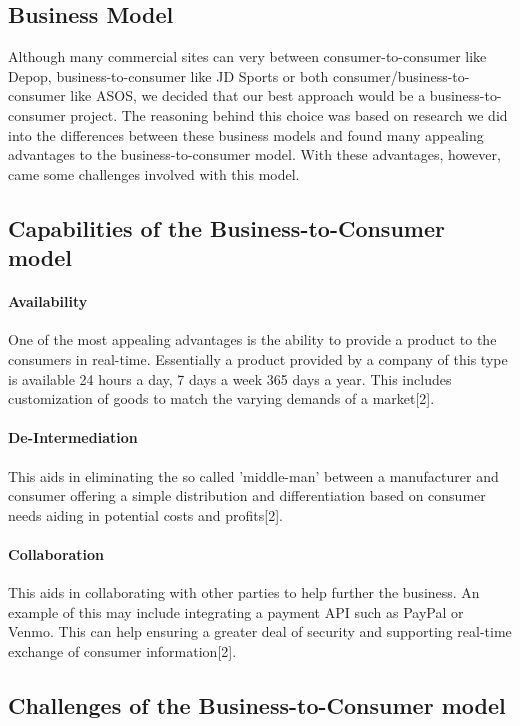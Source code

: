 \subsection{Business Model}

Although many commercial sites can very between consumer-to-consumer like Depop, business-to-consumer like JD Sports or both consumer/business-to-consumer like ASOS, we decided that our best approach would be a business-to-consumer project. The reasoning behind this choice was based on research we did into the differences between these business models and found many appealing advantages to the business-to-consumer model. With these advantages, however, came some challenges involved with this model.

\subsection{Capabilities of the Business-to-Consumer model}
\paragraph{Availability}One of the most appealing advantages is the ability to provide a product to the consumers in real-time. Essentially a product provided by a company of this type is available 24 hours a day, 7 days a week 365 days a year. This includes customization of goods to match the varying demands of a market[2].

\paragraph{De-Intermediation}This aids in eliminating the so called 'middle-man' between a manufacturer and consumer offering a simple distribution and differentiation based on consumer needs aiding in potential costs and profits[2].

\paragraph{Collaboration}This aids in collaborating with other parties to help further the business. An example of this may include integrating a payment API such as PayPal or Venmo. This can help ensuring a greater deal of security and supporting real-time exchange of consumer information[2].

\subsection{Challenges of the Business-to-Consumer model}
